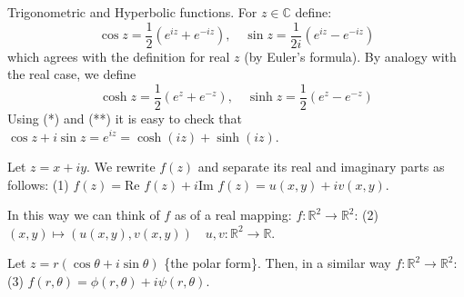 \begin{example} \label{example:3.7}
     Trigonometric and Hyperbolic functions. For $z \in \mathbb{C}$ define:
\begin{equation} \cos z = \frac{1}{2}(e^{iz} + e^{-iz}), \quad \sin z = \frac{1}{2i}(e^{iz} - e^{-iz}) \tag{*}\end{equation}
which agrees with the definition for real $z$ (by Euler's formula). By analogy with the real case, we define
\begin{equation} \cosh z = \frac{1}{2}(e^z + e^{-z}), \quad \sinh z = \frac{1}{2}(e^z - e^{-z})\tag{**}\end{equation}
Using (*) and (**) it is easy to check that \checkthis $\cos z + i\sin z = e^{iz} = \cosh(iz) + \sinh(iz)$.
\end{example}
Let $z = x + iy$. We rewrite $f(z)$ and separate its real and imaginary parts as follows:
(1) $f(z) = \text{Re } f(z) + i\text{Im } f(z) = u(x, y) + iv(x, y)$.

In this way we can think of $f$ as of a real mapping:
$f: \mathbb{R}^2 \to \mathbb{R}^2$: (2) $(x, y) \mapsto (u(x, y), v(x, y)) \quad u, v: \mathbb{R}^2 \to \mathbb{R}$.

Let $z = r(\cos \theta + i\sin \theta)$ \{the polar form\}. Then, in a similar way $f: \mathbb{R}^2 \to \mathbb{R}^2$: (3) $f(r, \theta) = \phi(r, \theta) + i\psi(r, \theta)$.

